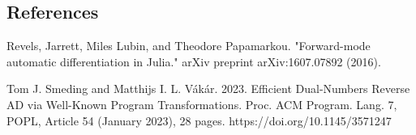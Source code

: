 \documentclass[a0,landscape]{a0poster}
\begin{document}
\begin{multicols}{4}
\section*{References}
\begin{enumerate}[{label=[\arabic{*}]}]
    \item Revels, Jarrett, Miles Lubin, and Theodore Papamarkou. "Forward-mode automatic differentiation in Julia." arXiv preprint arXiv:1607.07892 (2016).
    \item Tom J. Smeding and Matthijs I. L. Vákár. 2023. Efficient Dual-Numbers Reverse AD via Well-Known Program Transformations. Proc. ACM Program. Lang. 7, POPL, Article 54 (January 2023), 28 pages. https://doi.org/10.1145/3571247
\end{enumerate}

\end{multicols}
\end{document}
